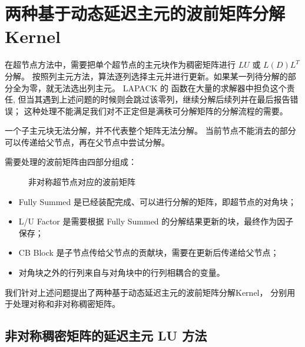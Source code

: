 \chapter{两种基于动态延迟主元的波前矩阵分解Kernel}
\label{chap:chap3}
在超节点方法中，需要把单个超节点的主元块作为稠密矩阵进行 $LU$ 或 $L(D)L^T$ 分解。
按照列主元方法，算法逐列选择主元并进行更新。如果某一列待分解的部分全为零，就无法选出列主元。
LAPACK 的  函数在大量的求解器中担负这个责任,
但当其遇到上述问题的时候则会跳过该零列，继续分解后续列并在最后报告错误；
这种处理不能满足我们对不正定但是满秩可分解矩阵的分解流程的需要。

一个子主元块无法分解，并不代表整个矩阵无法分解。
当前节点不能消去的部分可以传递给父节点，再在父节点中尝试分解。

需要处理的波前矩阵由四部分组成：

\begin{figure}[htbp]
\centering
{}
\caption{非对称超节点对应的波前矩阵}
\label{fig:appendix-a-unsym-front}
\end{figure}
\begin{itemize}
  \item Fully Summed 是已经装配完成、可以进行分解的矩阵，即超节点的对角块；
  \item L/U Factor 是需要根据 Fully Summed 的分解结果更新的块，最终作为因子保存；
  \item CB Block 是子节点传给父节点的贡献块，需要在更新后传递给父节点；
  \item 对角块之外的行列来自与对角块中的行列相耦合的变量。
\end{itemize}

我们针对上述问题提出了两种基于动态延迟主元的波前矩阵分解Kernel，
分别用于处理对称和非对称稠密矩阵。

\section{非对称稠密矩阵的延迟主元 LU 方法}

